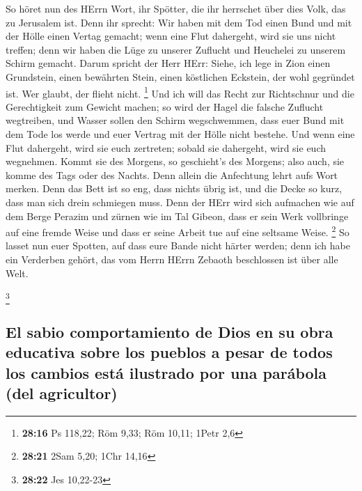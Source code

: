  So höret nun des HErrn Wort, ihr Spötter, die ihr
herrschet über dies Volk, das zu Jerusalem ist.  Denn ihr
sprecht: Wir haben mit dem Tod einen Bund und mit der Hölle einen Vertag
gemacht; wenn eine Flut dahergeht, wird sie uns nicht treffen; denn wir
haben die Lüge zu unserer Zuflucht und Heuchelei zu unserem Schirm
gemacht.  Darum spricht der Herr HErr: Siehe, ich lege in
Zion einen Grundstein, einen bewährten Stein, einen köstlichen Eckstein,
der wohl gegründet ist. Wer glaubt, der flieht nicht. \footnote{\textbf{28:16}
  Ps 118,22; Röm 9,33; Röm 10,11; 1Petr 2,6}  Und ich
will das Recht zur Richtschnur und die Gerechtigkeit zum Gewicht machen;
so wird der Hagel die falsche Zuflucht wegtreiben, und Wasser sollen den
Schirm wegschwemmen,  dass euer Bund mit dem Tode los
werde und euer Vertrag mit der Hölle nicht bestehe. Und wenn eine Flut
dahergeht, wird sie euch zertreten; sobald sie dahergeht, wird sie euch
wegnehmen.  Kommt sie des Morgens, so geschieht's des
Morgens; also auch, sie komme des Tags oder des Nachts. Denn allein die
Anfechtung lehrt aufs Wort merken.  Denn das Bett ist so
eng, dass nichts übrig ist, und die Decke so kurz, dass man sich drein
schmiegen muss.  Denn der HErr wird sich aufmachen wie
auf dem Berge Perazim und zürnen wie im Tal Gibeon, dass er sein Werk
vollbringe auf eine fremde Weise und dass er seine Arbeit tue auf eine
seltsame Weise. \footnote{\textbf{28:21} 2Sam 5,20; 1Chr 14,16}
 So lasset nun euer Spotten, auf dass eure Bande nicht
härter werden; denn ich habe ein Verderben gehört, das vom Herrn HErrn
Zebaoth beschlossen ist über alle Welt.

\footnote{\textbf{28:22} Jes 10,22-23}

\hypertarget{el-sabio-comportamiento-de-dios-en-su-obra-educativa-sobre-los-pueblos-a-pesar-de-todos-los-cambios-estuxe1-ilustrado-por-una-paruxe1bola-del-agricultor}{%
\subsection{El sabio comportamiento de Dios en su obra educativa sobre
los pueblos a pesar de todos los cambios está ilustrado por una parábola
(del
agricultor)}\label{el-sabio-comportamiento-de-dios-en-su-obra-educativa-sobre-los-pueblos-a-pesar-de-todos-los-cambios-estuxe1-ilustrado-por-una-paruxe1bola-del-agricultor}}


